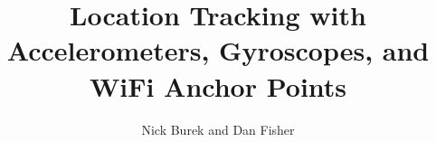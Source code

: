 \documentclass[11pt,twocolumn]{article}
\title{Location Tracking with Accelerometers, Gyroscopes, and WiFi Anchor Points}
\author{Nick Burek and Dan Fisher}
\begin{document}
\maketitle








{\footnotesize 
}
\end{document}
